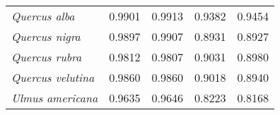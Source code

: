 \begin{table}[tb]
\begin{tabular}{lllll}
{\it Quercus alba}            & 0.9901          & 0.9913          & 0.9382         & 0.9454         \\
{\it Quercus nigra}           & 0.9897          & 0.9907          & 0.8931         & 0.8927         \\
{\it Quercus rubra}           & 0.9812          & 0.9807          & 0.9031         & 0.8980         \\
{\it Quercus velutina}        & 0.9860          & 0.9860          & 0.9018         & 0.8940         \\
{\it Ulmus americana}         & 0.9635          & 0.9646          & 0.8223         & 0.8168         \\
\bottomrule
\end{tabular}
\end{table}


